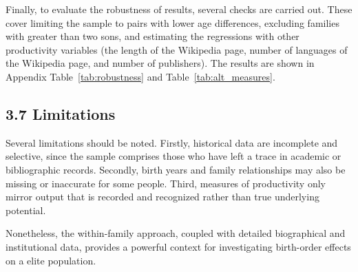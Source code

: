 Finally, to evaluate the robustness of results, several checks are carried out. These cover limiting the sample to pairs with lower age differences, excluding families with greater than two sons, and estimating the regressions with other productivity variables (the length of the Wikipedia page, number of languages of the Wikipedia page, and number of publishers). The results are shown in Appendix Table~\ref{tab:robustness} and Table~\ref{tab:alt_measures}.

\subsection*{3.7 Limitations}
 
Several limitations should be noted. Firstly, historical data are incomplete and selective, since the sample comprises those who have left a trace in academic or bibliographic records. Secondly, birth years and family relationships may also be missing or inaccurate for some people. Third, measures of productivity only mirror output that is recorded and recognized rather than true underlying potential.

Nonetheless, the within-family approach, coupled with detailed biographical and institutional data, provides a powerful context for investigating birth-order effects on a elite population.